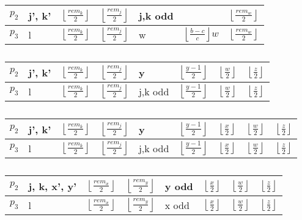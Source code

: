 \documentclass{article}
\newcommand{\floor}[3][2]{\left \lfloor\frac{#2}{#3}\right \rfloor}
\begin{document}
\begin{table}[h]
    \centering
    \begin{tabular}{|l|l|l|l|l|l|l|}
        \hline
        $p_2$ & j', k' & $\floor{rem_k}{2}$ & $\floor{rem_j}{2}$ & j,k odd &                & $\floor{rem_w}{2}$ \\ \hline
        $p_3$ & l      & $\floor{rem_k}{2}$ & $\floor{rem_j}{2}$ & w       & $\floor{b-c}{c}w$ & $\floor{rem_w}{2}$ \\ \hline
    \end{tabular}
    \caption{}
    \label{table:abb-abb-bbb-y=0-l<j+k-x=0}
\end{table}

\begin{table}[h]
    \centering
    \begin{tabular}{|l|l|l|l|l|l|l|l|}
        \hline
        $p_2$ & j', k' & $\floor{rem_k}{2}$ & $\floor{rem_j}{2}$ & y       & $\floor{y-1}{2}$ & $\floor{w}{2}$ & $\floor{z}{2}$ \\ \hline
        $p_3$ & l      & $\floor{rem_k}{2}$ & $\floor{rem_j}{2}$ &j,k odd  & $\floor{y-1}{2}$ & $\floor{w}{2}$ & $\floor{z}{2}$ \\ \hline
    \end{tabular}
    \caption{}
    \label{table:abb-abb-bbb-y=0-l<j+k-x>0}
\end{table}

\begin{table}[h]
    \centering
    \begin{tabular}{|l|l|l|l|l|l|l|l|l|}
        \hline
        $p_2$ & j', k' & $\floor{rem_k}{2}$ & $\floor{rem_j}{2}$ & y       & $\floor{y-1}{2}$ & $\floor{x}{2}$ & $\floor{w}{2}$ & $\floor{z}{2}$ \\ \hline
        $p_3$ & l      & $\floor{rem_k}{2}$ & $\floor{rem_j}{2}$ &j,k odd  & $\floor{y-1}{2}$ & $\floor{x}{2}$ & $\floor{w}{2}$ & $\floor{z}{2}$ \\ \hline
    \end{tabular}
    \caption{}
    \label{table:abb-abb-bbb-y>0-l<j+k-x>=0}
\end{table}

\begin{table}[h]
    \centering
    \begin{tabular}{|l|l|l|l|l|l|l|l|}
        \hline
        $p_2$ & j, k, x', y' & $\floor{rem_x}{2}$ & $\floor{rem_y}{2}$ & y odd      & $\floor{x}{2}$ & $\floor{w}{2}$ & $\floor{z}{2}$ \\ \hline
        $p_3$ & l            & $\floor{rem_x}{2}$ & $\floor{rem_y}{2}$ & x odd      & $\floor{x}{2}$ & $\floor{w}{2}$ & $\floor{z}{2}$ \\ \hline
    \end{tabular}
    \caption{}
    \label{table:abb-abb-bbb-y>0-l<x+y+j+k-x>=0}
\end{table}
\end{document}
